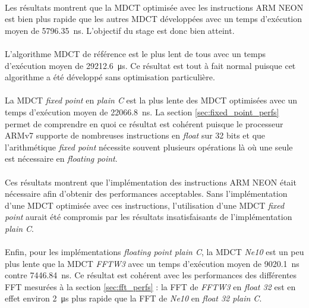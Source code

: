 \documentclass{article}
\begin{document}
    \paragraph{}
    Les résultats montrent que la MDCT optimisée avec les instructions ARM NEON est bien plus rapide que les autres MDCT développées avec un temps d'exécution moyen de \SI{5796.35}{\nano\second}. L'objectif du stage est donc bien atteint.

    \paragraph{}
    L'algorithme MDCT de référence est le plus lent de tous avec un temps d'exécution moyen de \SI{29212.6}{\micro\second}. Ce résultat est tout à fait normal puisque cet algorithme a été développé sans optimisation particulière.

    \paragraph{}
    La MDCT \emph{fixed point} en \emph{plain C} est la plus lente des MDCT optimisées avec un temps d'exécution moyen de \SI{22066.8}{\nano\second}. La section \ref{sec:fixed_point_perfs} permet de comprendre en quoi ce résultat est cohérent puisque le processeur ARMv7 supporte de nombreuses instructions en \emph{float} sur 32 bits et que l'arithmétique \emph{fixed point} nécessite souvent plusieurs opérations là où une seule est nécessaire en \emph{floating point}.

    \paragraph{}
    Ces résultats montrent que l'implémentation des instructions ARM NEON était nécessaire afin d'obtenir des performances acceptables. Sans l'implémentation d'une MDCT optimisée avec ces instructions, l'utilisation d'une MDCT \emph{fixed point} aurait été compromis par les résultats insatisfaisants de l'implémentation \emph{plain C}.

    \paragraph{}
    Enfin, pour les implémentations \emph{floating point plain C}, la MDCT \emph{Ne10} est un peu plus lente que la MDCT \emph{FFTW3} avec un temps d'exécution moyen de \SI{9020.1}{\nano\second} contre \SI{7446.84}{\nano\second}. Ce résultat est cohérent avec les performances des différentes FFT mesurées à la section \ref{sec:fft_perfs} : la FFT de \emph{FFTW3} en \emph{float 32} est en effet environ \SI{2}{\micro\second} plus rapide que la FFT de \emph{Ne10} en \emph{float 32 plain C}.
\end{document}
